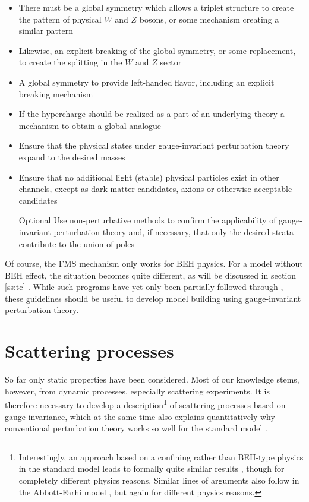 \documentclass[final,twoside,12pt]{article}
\newcommand*{\1}{1\!\!\!\bot}
\begin{document}
\begin{itemize}
 \item There must be a global symmetry which allows a triplet structure to create the pattern of physical $W$ and $Z$ bosons, or some mechanism creating a similar pattern
 \item Likewise, an explicit breaking of the global symmetry, or some replacement, to create the splitting in the $W$ and $Z$ sector
 \item A global symmetry to provide left-handed flavor, including an explicit breaking mechanism
 \item If the hypercharge should be realized as a part of an underlying theory a mechanism to obtain a global analogue
 \item Ensure that the physical states under gauge-invariant perturbation theory expand to the desired masses
 \item Ensure that no additional light (stable) physical particles exist in other channels, except as dark matter candidates, axions or otherwise acceptable candidates
 \item[Optional] Use non-perturbative methods to confirm the applicability of gauge-invariant perturbation theory and, if necessary, that only the desired strata contribute to the union of poles
\end{itemize}
Of course, the FMS mechanism only works for BEH physics. For a model without BEH effect, the situation becomes quite different, as will be discussed in section \ref{ss:tc} \cite{Maas:2015gma}. While such programs have yet only been partially followed through \cite{Maas:2015gma,Maas:2016qpu,Maas:2017xzh}, these guidelines should be useful to develop model building using gauge-invariant perturbation theory.

\section{Scattering processes}\label{s:scattering}

So far only static properties have been considered. Most of our knowledge stems, however, from dynamic processes, especially scattering experiments. It is therefore necessary to develop a description\footnote{Interestingly, an approach based on a confining rather than BEH-type physics in the standard model leads to formally quite similar results \cite{Calmet:2000th,Calmet:2001rp,Calmet:2001yd,Calmet:2002mf}, though for completely different physics reasons. Similar lines of arguments \cite{Dosch:1983hr,Dosch:1984ec} also follow in the Abbott-Farhi model \cite{Abbott:1981re}, but again for different physics reasons.} of scattering processes based on gauge-invariance, which at the same time also explains quantitatively why conventional perturbation theory works so well for the standard model \cite{pdg}.
\end{document}
